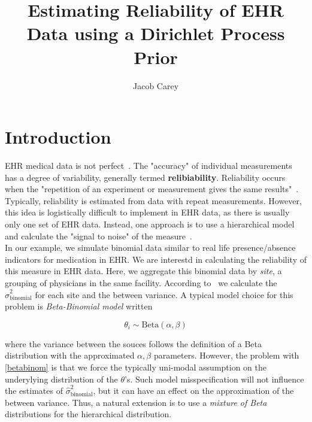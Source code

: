 \documentclass{article}
\begin{document}
\title{Estimating Reliability of EHR Data using a Dirichlet Process Prior}
\author{Jacob Carey}

\maketitle

\section{Introduction}

EHR medical data is not perfect~\cite{kanger2014}. The "accuracy" of individual measurements has a degree of variability, generally termed \textbf{relibiability}. Reliability occurs when the "repetition of an experiment or measurement gives the same results"~\cite{porta2008}.  Typically, reliability is estimated from data with repeat measurements. However, this idea is logistically difficult to implement in EHR data, as there is usually only one set of EHR data. Instead, one approach is to use a hierarchical model and calculate the "signal to noise" of the measure~\cite{Adams2009}. \\

In our example, we simulate binomial data similar to real life presence/absence indicators for medication in EHR. We are interestd in calculating the reliability of this measure in EHR data. Here, we aggregate this binomial data by \textit{site}, a grouping of physicians in the same facility. According to~\cite{Adams2009} we calculate the $\hat{\sigma}^2_{\text{binomial}}$ for each site and the between variance. A typical model choice for this problem is \textit{Beta-Binomial model} written

\begin{equation}\label{betabinom}
\theta_i \sim \text{Beta}(\alpha, \beta)
\end{equation}

where the variance between the souces follows the definition of a Beta distribution with the approximated $\alpha, \beta$ parameters. However, the problem with \eqref{betabinom} is that we force the typically uni-modal assumption on the underylying distribution of the $\theta$'s. Such model misspecification will not influence the estimates of $\hat{\sigma}^2_{\text{binomial}}$, but it can have an effect on the approximation of the between variance. Thus, a natural extension is to use a \textit{mixture of Beta} distributions for the hierarchical distribution.
\end{document}
